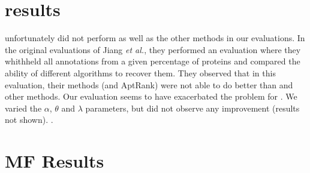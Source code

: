 \section{\birgrank results}
\label{sec:loso-birgrank}
\birgrank unfortunately did not perform as well as the other methods in our \loso evaluations. 
In the original evaluations of Jiang \textit{et al.}, they performed an evaluation where they whithheld all annotations from a given percentage of proteins and compared the ability of different algorithms to recover them. 
They observed that in this evaluation, their methods (\birgrank and AptRank) were not able to do better than \genemania and other methods. 
Our \loso evaluation seems to have exacerbated the problem for \birgrank. 
We varied the $\alpha$, $\theta$ and $\lambda$ parameters, but did not observe any improvement (results not shown).
.

\section{MF Results}

